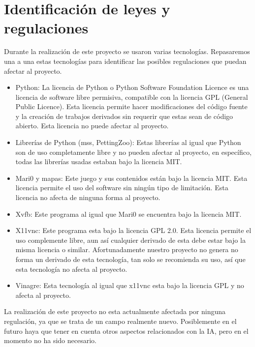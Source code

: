 \chapter{Identificación de leyes y regulaciones}

Durante la realización de este proyecto se usaron varias tecnologías. Repasaremos una a una estas tecnologías para identificar las posibles regulaciones que puedan afectar al proyecto.

\begin{itemize}
    \item Python: La licencia de Python o Python Software Foundation Licence es una licencia de software libre permisiva, compatible con la licencia GPL (General Public Licence). Esta licencia permite hacer modificaciones del código fuente y la creación de trabajos derivados sin requerir que estas sean de código abierto. Esta licencia no puede afectar al proyecto.
    \item Librerías de Python (mss, PettingZoo): Estas librerías al igual que Python son de uso completamente libre y no pueden afectar al proyecto, en específico, todas las librerías usadas estaban bajo la licencia MIT.
    \item Mari0 y mapas: Este juego y sus contenidos están bajo la licencia MIT. Esta licencia permite el uso del software sin ningún tipo de limitación. Esta licencia no afecta de ninguna forma al proyecto.
    \item Xvfb: Este programa al igual que Mari0 se encuentra bajo la licencia MIT.
    \item X11vnc: Este programa esta bajo la licencia GPL 2.0. Esta licencia permite el uso complemente libre, aun así cualquier derivado de esta debe estar bajo la misma licencia o similar. Afortunadamente nuestro proyecto no genera no forma un derivado de esta tecnología, tan solo se recomienda su uso, así que esta tecnología no afecta al proyecto.
    \item Vinagre: Esta tecnología al igual que x11vnc esta bajo la licencia GPL y no afecta al proyecto.
\end{itemize}

La realización de este proyecto no esta actualmente afectada por ninguna regulación, ya que se trata de un campo realmente nuevo. Posiblemente en el futuro haya que tener en cuenta otros aspectos relacionados con la IA, pero en el momento no ha sido necesario.
